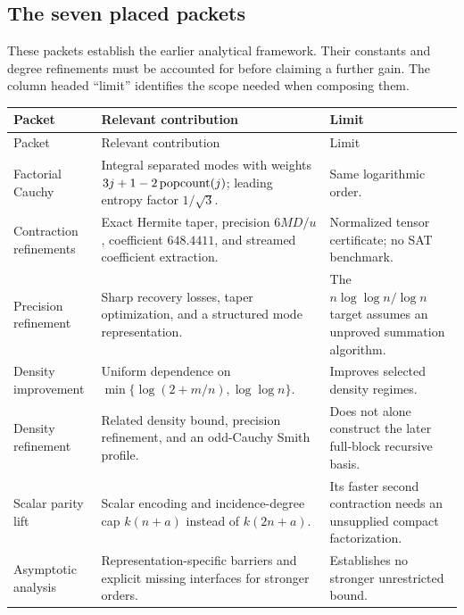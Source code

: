 \subsection{The seven placed packets}

These packets establish the earlier analytical framework. Their constants
and degree refinements must be accounted for before claiming a further gain.
The column headed ``limit'' identifies the scope needed when composing them.

\begingroup
\small
\setlength{\tabcolsep}{4pt}
\begin{longtable}{@{}>{\raggedright\arraybackslash}p{}>{\raggedright\arraybackslash}p{}>{\raggedright\arraybackslash}p{}@{}}
\toprule
Packet & Relevant contribution & Limit\\
\midrule
\endfirsthead
\toprule
Packet & Relevant contribution & Limit\\
\midrule
\endhead
Factorial Cauchy\cite{cauchy}
& Integral separated modes with weights $3j+1-2\operatorname{popcount}(j)$; leading entropy factor $1/\sqrt3$.
& Same logarithmic order.\\[4pt]
Contraction refinements\cite{contraction}
& Exact Hermite taper, precision $6MD/u$, coefficient $648.4411$, and streamed coefficient extraction.
& Normalized tensor certificate; no SAT benchmark.\\[4pt]
Precision refinement\cite{precision}
& Sharp recovery losses, taper optimization, and a structured mode representation.
& The $n\log\log n/\log n$ target assumes an unproved summation algorithm.\\[4pt]
Density improvement\cite{density}
& Uniform dependence on $\min\{\log(2+m/n),\log\log n\}$.
& Improves selected density regimes.\\[4pt]
Density refinement\cite{density2}
& Related density bound, precision refinement, and an odd-Cauchy Smith profile.
& Does not alone construct the later full-block recursive basis.\\[4pt]
Scalar parity lift\cite{scalar}
& Scalar encoding and incidence-degree cap $k(n+a)$ instead of $k(2n+a)$.
& Its faster second contraction needs an unsupplied compact factorization.\\[4pt]
Asymptotic analysis\cite{barriers}
& Representation-specific barriers and explicit missing interfaces for stronger orders.
& Establishes no stronger unrestricted bound.\\
\bottomrule
\end{longtable}
\endgroup

